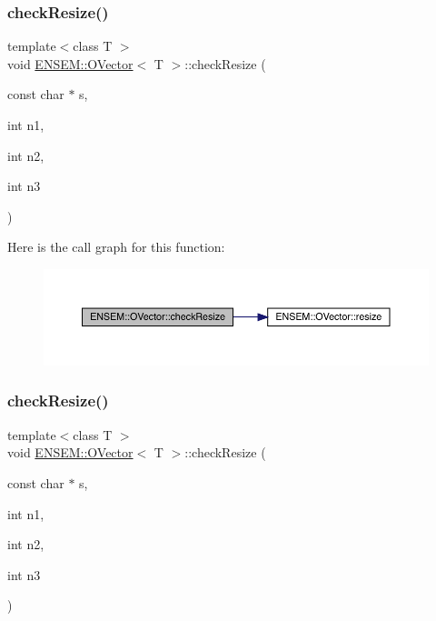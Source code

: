 \subsubsection{\texorpdfstring{checkResize()}{checkResize()}\hspace{0.1cm}{\footnotesize\ttfamily [8/9]}}
{\footnotesize\ttfamily template$<$class T $>$ \\
void \mbox{\hyperlink{classENSEM_1_1OVector}{E\+N\+S\+E\+M\+::\+O\+Vector}}$<$ T $>$\+::check\+Resize (\begin{DoxyParamCaption}\item[{const char $\ast$}]{s,  }\item[{int}]{n1,  }\item[{int}]{n2,  }\item[{int}]{n3 }\end{DoxyParamCaption})\hspace{0.3cm}{\ttfamily [inline]}}

Here is the call graph for this function\+:
\nopagebreak
\begin{figure}[H]
\begin{center}
\leavevmode
\includegraphics[width=350pt]{d0/d8d/classENSEM_1_1OVector_ac909025f6c5d78479f5dcbef8151d571_cgraph}
\end{center}
\end{figure}
\mbox{\label{classENSEM_1_1OVector_ac909025f6c5d78479f5dcbef8151d571}} 
\subsubsection{\texorpdfstring{checkResize()}{checkResize()}\hspace{0.1cm}{\footnotesize\ttfamily [9/9]}}
{\footnotesize\ttfamily template$<$class T $>$ \\
void \mbox{\hyperlink{classENSEM_1_1OVector}{E\+N\+S\+E\+M\+::\+O\+Vector}}$<$ T $>$\+::check\+Resize (\begin{DoxyParamCaption}\item[{const char $\ast$}]{s,  }\item[{int}]{n1,  }\item[{int}]{n2,  }\item[{int}]{n3 }\end{DoxyParamCaption})\hspace{0.3cm}{\ttfamily [inline]}}

